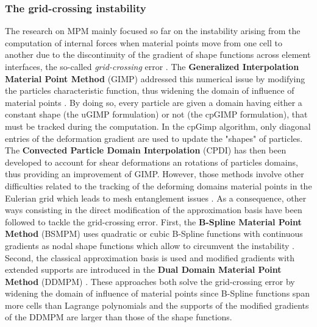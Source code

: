 \subsubsection*{The grid-crossing instability}
The research on MPM mainly focused so far on the instability arising from the computation of internal forces when material points move from one cell to another due to the discontinuity of the gradient of shape functions across element interfaces, the so-called \textit{grid-crossing} error \cite{Gimp}. The \textbf{Generalized Interpolation Material Point Method} (GIMP) addressed this numerical issue by modifying the particles characteristic function, thus widening the domain of influence of material points \cite{Gimp}. By doing so, every particle are given a domain having either a constant shape (the uGIMP formulation) or not (the cpGIMP formulation), that must be tracked during the computation. In the cpGimp algorithm, only diagonal entries of the deformation gradient are used to update the "shapes" of particles. The \textbf{Convected Particle Domain Interpolation} (CPDI) \cite{CPDI} has then been developed to account for shear deformations an rotations of particles domains, thus providing an improvement of GIMP. However, those methods involve other difficulties related to the tracking of the deforming domains material points in the Eulerian grid which leads to mesh entanglement issues \cite{DDMPM0}. As a consequence, other ways consisting in the direct modification of the approximation basis have been followed to tackle the grid-crossing error. First, the \textbf{B-Spline Material Point Method} (BSMPM) \cite{Steffen_quadError} uses quadratic or cubic B-Spline functions with continuous gradients as nodal shape functions which allow to circumvent the instability \cite{MPM_BSpline1}%
. Second, the classical approximation basis is used and modified gradients with extended supports are introduced in the \textbf{Dual Domain Material Point Method} (DDMPM) \cite{DDMPM0}. These approaches both solve the grid-crossing error by widening the domain of influence of material points since B-Spline functions span more cells than Lagrange polynomials and the supports of the modified gradients of the DDMPM are larger than those of the shape functions.  

